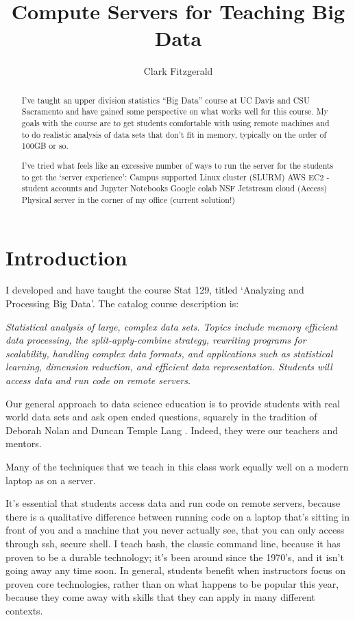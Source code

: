 \documentclass[12pt]{article}
\title{Compute Servers for Teaching Big Data}
\author{Clark Fitzgerald}
\begin{document}
\maketitle

\begin{abstract}

I've taught an upper division statistics ``Big Data'' course at UC Davis and CSU Sacramento and have gained some perspective on what works well for this course.
My goals with the course are to get students comfortable with using remote machines and to do realistic analysis of data sets that don’t fit in memory, typically on the order of 100GB or so.
 
I’ve tried what feels like an excessive number of ways to run the server for the students to get the `server experience':
Campus supported Linux cluster (SLURM)
AWS EC2 - student accounts and Jupyter Notebooks
Google colab
NSF Jetstream cloud (Access)
Physical server in the corner of my office (current solution!)

\end{abstract}

\section{Introduction}


I developed and have taught the course Stat 129, titled `Analyzing and Processing Big Data'.
The catalog course description is:

\emph{
Statistical analysis of large, complex data sets. Topics include memory efficient data processing, the split-apply-combine strategy, rewriting programs for scalability, handling complex data formats, and applications such as statistical learning, dimension reduction, and efficient data representation. Students will access data and run code on remote servers.
}

Our general approach to data science education is to provide students with real world data sets and ask open ended questions, squarely in the tradition of Deborah Nolan and Duncan Temple Lang \cite{nolan2010computing}.
Indeed, they were our teachers and mentors.

Many of the techniques that we teach in this class work equally well on a modern laptop as on a server.

It's essential that students access data and run code on remote servers, because there is a qualitative difference between running code on a laptop that's sitting in front of you and a machine that you never actually see, that you can only access through ssh, secure shell.
I teach bash, the classic command line, because it has proven to be a durable technology; it's been around since the 1970's, and it isn't going away any time soon.
In general, students benefit when instructors focus on proven core technologies, rather than on what happens to be popular this year, because they come away with skills that they can apply in many different contexts.
\end{document}
